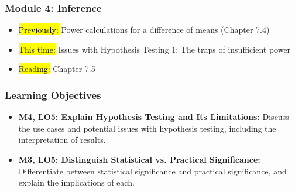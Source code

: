 
\begin{frame}
    \frametitle{Module 4: Inference}
    \begin{itemize}
        \item \hl{Previously: }Power calculations for a difference of means (Chapter 7.4)
        \item \hl{This time: }Issues with Hypothesis Testing 1: The traps of insufficient power
        \item \hl{Reading: }Chapter 7.5
    \end{itemize}

\end{frame}
\begin{frame}
    \frametitle{Learning Objectives}
    \begin{itemize}
        \item \textbf{M4, LO5: Explain Hypothesis Testing and Its Limitations:} Discuss the use cases and potential issues with hypothesis testing, including the interpretation of results.
        \item \textbf{M3, LO5: Distinguish Statistical vs. Practical Significance:} Differentiate between statistical significance and practical significance, and explain the implications of each.
    \end{itemize}
\end{frame}
